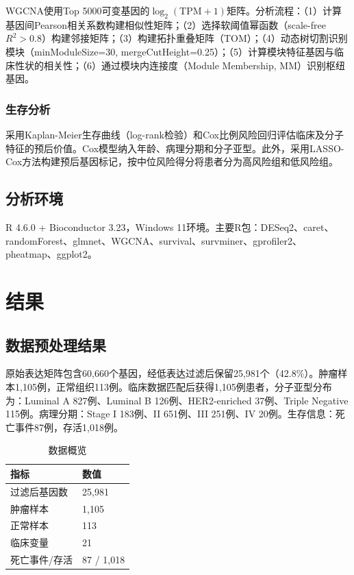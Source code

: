 \documentclass[12pt,a4paper]{article}
\begin{document}
WGCNA\cite{langfelder2008}使用Top 5000可变基因的$\log_2(\text{TPM}+1)$矩阵。分析流程：（1）计算基因间Pearson相关系数构建相似性矩阵；（2）选择软阈值幂函数（scale-free $R^2>0.8$）构建邻接矩阵；（3）构建拓扑重叠矩阵（TOM）；（4）动态树切割识别模块（minModuleSize=30, mergeCutHeight=0.25）；（5）计算模块特征基因与临床性状的相关性；（6）通过模块内连接度（Module Membership, MM）识别枢纽基因。

\subsubsection{生存分析}

采用Kaplan-Meier生存曲线（log-rank检验）和Cox比例风险回归\cite{therneau2000}评估临床及分子特征的预后价值。Cox模型纳入年龄、病理分期和分子亚型。此外，采用LASSO-Cox\cite{simon2011}方法构建预后基因标记，按中位风险得分将患者分为高风险组和低风险组。

\subsection{分析环境}

R 4.6.0 + Bioconductor 3.23，Windows 11环境。主要R包：DESeq2、caret、randomForest、glmnet、WGCNA、survival、survminer、gprofiler2、pheatmap、ggplot2。

\section{结果}

\subsection{数据预处理结果}

原始表达矩阵包含60,660个基因，经低表达过滤后保留25,981个（42.8\%）。肿瘤样本1,105例，正常组织113例。临床数据匹配后获得1,105例患者，分子亚型分布为：Luminal A 827例、Luminal B 126例、HER2-enriched 37例、Triple Negative 115例。病理分期：Stage I 183例、II 651例、III 251例、IV 20例。生存信息：死亡事件87例，存活1,018例。

\begin{table}[H]
\centering
\caption{数据概览}
\begin{tabular}{ll}
\toprule
指标 & 数值 \\
\midrule
过滤后基因数 & 25,981 \\
肿瘤样本 & 1,105 \\
正常样本 & 113 \\
临床变量 & 21 \\
死亡事件/存活 & 87 / 1,018 \\
\bottomrule
\end{tabular}
\end{table}
\end{document}
